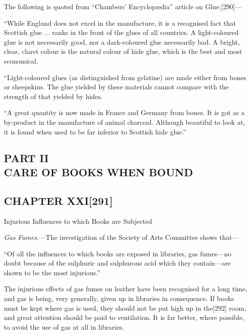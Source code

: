 \documentclass[
]{article}
\begin{document}
The following is quoted from ``Chambers' Encyclopædia'' article on
Glue:{\protect\hypertarget{Page_290}{}{{[}290{]}}}---

``While England does not excel in the manufacture, it is a recognised
fact that Scottish glue ... ranks in the front of the glues of all
countries. A light-coloured glue is not necessarily good, nor a
dark-coloured glue necessarily bad. A bright, clear, claret colour is
the natural colour of hide glue, which is the best and most economical.

``Light-coloured glues (as distinguished from gelatine) are made either
from bones or sheepskins. The glue yielded by these materials cannot
compare with the strength of that yielded by hides.

``A great quantity is now made in France and Germany from bones. It is
got as a by-product in the manufacture of animal charcoal. Although
beautiful to look at, it is found when used to be far inferior to
Scottish hide glue.''

\hypertarget{part-ii-care-of-books-when-bound}{%
\subsection[PART II\\
CARE OF BOOKS WHEN
BOUND]{\texorpdfstring{\protect\hypertarget{PART_II}{}{}PART II\\
CARE OF BOOKS WHEN
BOUND}{PART II CARE OF BOOKS WHEN BOUND}}\label{part-ii-care-of-books-when-bound}}

\hypertarget{chapter-xxi291}{%
\subsection[CHAPTER
XXI]{\texorpdfstring{\protect\hypertarget{CHAPTER_XXI}{}{}CHAPTER
XXI{\protect\hypertarget{Page_291}{}{{[}291{]}}}}{CHAPTER XXI{[}291{]}}}\label{chapter-xxi291}}

Injurious Influences to which Books are Subjected

\emph{Gas Fumes.}---The investigation of the Society of Arts Committee
shows that---

``Of all the influences to which books are exposed in libraries, gas
fumes---no doubt because of the sulphuric and sulphurous acid which they
contain---are shown to be the most injurious.''

The injurious effects of gas fumes on leather have been recognised for a
long time, and gas is being, very generally, given up in libraries in
consequence. If books must be kept where gas is used, they should not be
put high up in the{\protect\hypertarget{Page_292}{}{{[}292{]}}} room,
and great attention should be paid to ventilation. It is far better,
where possible, to avoid the use of gas at all in libraries.
\end{document}
